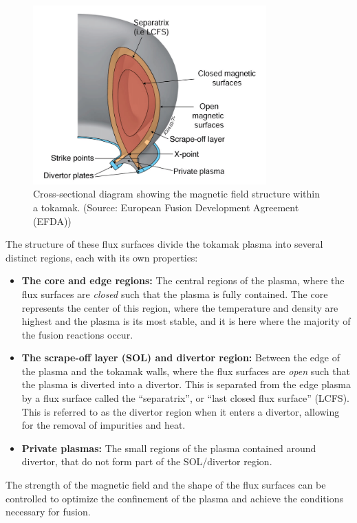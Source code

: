     \begin{figure}[!ht]
        \centering
        \includegraphics[width = 0.8\textwidth]{0 - introduction/1 - plasmas/3 - tokamaks/images/tokamak structure.png}
        \caption{Cross-sectional diagram showing the magnetic field structure within a tokamak. (Source: European Fusion Development Agreement (EFDA))}
        \label{fig:tokamak structure}
    \end{figure}

    The structure of these flux surfaces divide the tokamak plasma into several distinct regions, each with its own properties:
    \begin{itemize}
        \item  {\bf The core and edge regions:} The central regions of the plasma, where the flux surfaces are \emph{closed} such that the plasma is fully contained. The core represents the center of this region, where the temperature and density are highest and the plasma is its most stable, and it is here where the majority of the fusion reactions occur.
        \item  {\bf The scrape-off layer (SOL) and divertor region:} Between the edge of the plasma and the tokamak walls, where the flux surfaces are \emph{open} such that the plasma is diverted into a divertor. This is separated from the edge plasma by a flux surface called the ``separatrix'', or ``last closed flux surface'' (LCFS). This is referred to as the divertor region when it enters a divertor, allowing for the removal of impurities and heat.
        \item  {\bf Private plasmas:} The small regions of the plasma contained around divertor, that do not form part of the SOL/divertor region.
    \end{itemize}
    The strength of the magnetic field and the shape of the flux surfaces can be controlled to optimize the confinement of the plasma and achieve the conditions necessary for fusion.
    